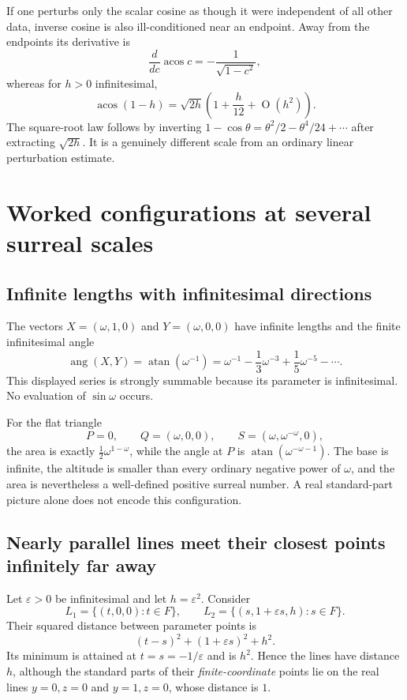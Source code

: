 \documentclass[11pt,letterpaper]{article}
\numberwithin{equation}{section}
\theoremstyle{definition}
\theoremstyle{remark}
\newcommand{\eps}{\varepsilon}
\newcommand{\atan}{\operatorname{atan}}
\newcommand{\acos}{\operatorname{acos}}
\newcommand{\ang}{\operatorname{ang}}
\newcommand{\smallO}{\operatorname{O}}
\begin{document}
If one perturbs only the scalar cosine as though it were independent
of all other data, inverse cosine is also ill-conditioned near an endpoint.
Away from the endpoints its derivative is
\[
 \frac{d}{dc}\acos c=-\frac1{\sqrt{1-c^2}},
\]
whereas for $h>0$ infinitesimal,
\begin{equation}\label{e3:eq:acos-endpoint}
 \acos(1-h)=\sqrt{2h}\left(1+\frac h{12}+\smallO(h^2)\right).
\end{equation}
The square-root law follows by inverting
$1-\cos\theta=\theta^2/2-\theta^4/24+\cdots$ after extracting
$\sqrt{2h}$. It is a genuinely different scale from an ordinary
linear perturbation estimate.

\section{Worked configurations at several surreal scales}\label{e3:sec:examples}

\subsection{Infinite lengths with infinitesimal directions}

The vectors $X=(\omega,1,0)$ and $Y=(\omega,0,0)$ have infinite
lengths and the finite infinitesimal angle
\[
 \ang(X,Y)=\atan(\omega^{-1})
 =\omega^{-1}-\frac13\omega^{-3}+\frac15\omega^{-5}-\cdots.
\]
This displayed series is strongly summable because its parameter is
infinitesimal. No evaluation of $\sin\omega$ occurs.

For the flat triangle
\[
 P=0,\qquad Q=(\omega,0,0),\qquad
 S=(\omega,\omega^{-\omega},0),
\]
the area is exactly $\tfrac12\omega^{1-\omega}$, while the angle at
$P$ is $\atan(\omega^{-\omega-1})$. The base is infinite, the
altitude is smaller than every ordinary negative power of $\omega$,
and the area is nevertheless a well-defined positive surreal number.
A real standard-part picture alone does not encode this configuration.

\subsection{Nearly parallel lines meet their closest points infinitely far away}

Let $\eps>0$ be infinitesimal and let $h=\eps^2$. Consider
\[
 L_1=\{(t,0,0):t\in F\},\qquad
 L_2=\{(s,1+\eps s,h):s\in F\}.
\]
Their squared distance between parameter points is
\[
 (t-s)^2+(1+\eps s)^2+h^2.
\]
Its minimum is attained at $t=s=-1/\eps$ and is $h^2$. Hence the
lines have distance $h$, although the standard parts of their
\emph{finite-coordinate} points lie on the real lines $y=0,z=0$
and $y=1,z=0$, whose distance is $1$.
\end{document}
